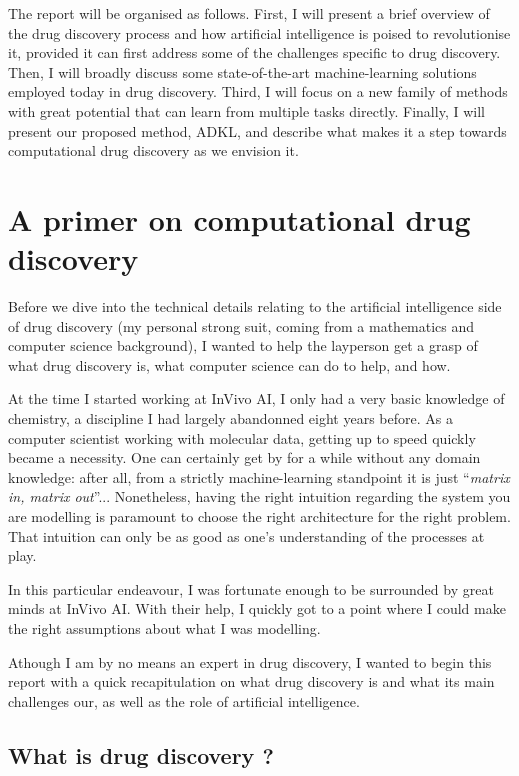 \documentclass[11pt]{article}
\numberwithin{equation}{subsection}
\begin{document}
The report will be organised as follows. First, I will present a brief overview of the drug discovery process and how artificial intelligence is poised to revolutionise it, provided it can first address some of the challenges specific to drug discovery. Then, I will broadly discuss some state-of-the-art machine-learning solutions employed today in drug discovery.
Third, I will focus on a new family of methods with great potential that can learn from multiple tasks directly.
Finally, I will present our proposed method, ADKL, and describe what makes it a step towards computational drug discovery as we envision it.


\clearpage
\section{A primer on computational drug discovery}
\label{sec:drug-discovery}

Before we dive into the technical details relating to the artificial intelligence side of drug discovery (my personal strong suit, coming from a mathematics and computer science background), I wanted to help the layperson get a grasp of what drug discovery is, what computer science can do to help, and how.

At the time I started working at InVivo AI, I only had a very basic knowledge of chemistry, a discipline I had largely abandonned eight years before. As a computer scientist working with molecular data, getting up to speed quickly became a necessity. One can certainly get by for a while without any domain knowledge: after all, from a strictly machine-learning standpoint it is just ``\textit{matrix in, matrix out}''... Nonetheless, having the right intuition regarding the system you are modelling is paramount to choose the right architecture for the right problem. That intuition can only be as good as one's understanding of the processes at play.

In this particular endeavour, I was fortunate enough to be surrounded by great minds at InVivo AI. With their help, I quickly got to a point where I could make the right assumptions about what I was modelling.

Athough I am by no means an expert in drug discovery, I wanted to begin this report with a quick recapitulation on what drug discovery is and what its main challenges our, as well as the role of artificial intelligence.


\subsection{What is drug discovery ?}
\end{document}
